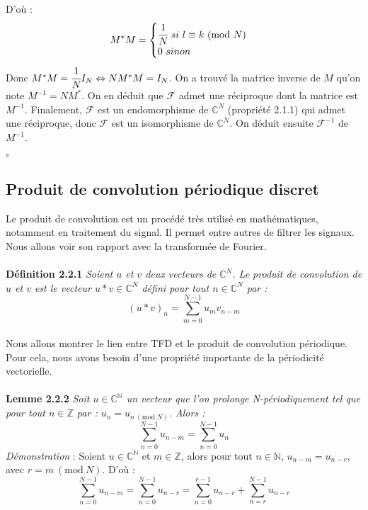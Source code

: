 \documentclass[12pt]{article}
\newcommand{\Mod}[1]{\ (\mathrm{mod}\ #1)}
\begin{document}
D'où :
\begin{equation*}
M^*M=
\begin{cases}
\cfrac{1}{N}~si~l \equiv k \Mod{N}\\
0~sinon
\end{cases}
\end{equation*}
Donc $M^*M=\cfrac{1}{N}I_N \Leftrightarrow NM^*M=I_N$. On a trouvé la matrice inverse de $M$ qu'on note $M^{-1}=NM^*$. On en déduit que $\mathcal{F}$ admet une réciproque dont la matrice est $M^{-1}$. Finalement, $\mathcal{F}$ est un endomorphisme de $\mathbb{C}^N$ (propriété 2.1.1) qui admet une réciproque, donc $\mathcal{F}$ est un isomorphisme de $\mathbb{C}^N$. On déduit ensuite $\mathcal{F}^{-1}$ de $M^{-1}$. \begin{flushright} $\square$ \end{flushright}
\subsection{Produit de convolution périodique discret}
Le produit de convolution est un procédé très utilisé en mathématiques, notamment en traitement du signal. Il permet entre autres de filtrer les signaux. Nous allons voir son rapport avec la transformée de Fourier.\\\\
\textbf{Définition 2.2.1} \textit{Soient $u$ et $v$ deux vecteurs de $\mathbb{C}^N$. Le produit de convolution de $u$ et $v$ est le vecteur $u\ast v \in \mathbb{C}^N$ défini pour tout $n \in \mathbb{C}^N$ par :\\
\begin{equation}
(u\ast v)_n = \sum_{m=0}^{N-1}u_mv_{n-m}
\end{equation}}\\
Nous allons montrer le lien entre TFD et le produit de convolution périodique. Pour cela, nous avons besoin d'une propriété importante de la périodicité vectorielle.\\\\
\textbf{Lemme 2.2.2} \textit{Soit $u\in \mathbb{C}^{\mathbb{N}}$ un vecteur que l'on prolonge N-périodiquement tel que pour tout $n \in \mathbb{Z}$ par : $u_n = u_{n\Mod{N}}$. Alors :} \begin{equation}
\sum_{n=0}^{N-1}u_{n-m}=\sum_{n=0}^{N-1}u_n
\end{equation}
\textit{Démonstration} : Soient $u\in \mathbb{C}^{\mathbb{N}}$ et $m \in \mathbb{Z}$, alors pour tout $n \in  \mathbb{N}$, $u_{n-m}=u_{n-r}$, avec $r=m\Mod{N}$. D'où : 
\begin{equation*}
\sum_{n=0}^{N-1}u_{n-m}=\sum_{n=0}^{N-1}u_{n-r}=\sum_{n=0}^{r-1}u_{n-r}+\sum_{n=r}^{N-1}u_{n-r}
\end{equation*}
\end{document}
